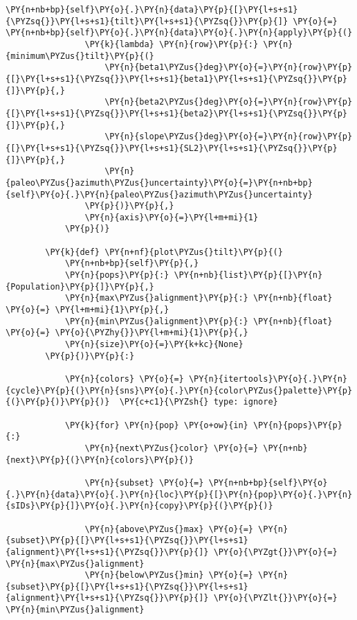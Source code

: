 \begin{tcolorbox}[breakable, size=fbox, boxrule=1pt, pad at break*=1mm,colback=cellbackground, colframe=cellborder]
\begin{Verbatim}[commandchars=\\\{\}]
            \PY{n+nb+bp}{self}\PY{o}{.}\PY{n}{data}\PY{p}{[}\PY{l+s+s1}{\PYZsq{}}\PY{l+s+s1}{tilt}\PY{l+s+s1}{\PYZsq{}}\PY{p}{]} \PY{o}{=} \PY{n+nb+bp}{self}\PY{o}{.}\PY{n}{data}\PY{o}{.}\PY{n}{apply}\PY{p}{(}
                \PY{k}{lambda} \PY{n}{row}\PY{p}{:} \PY{n}{minimum\PYZus{}tilt}\PY{p}{(}
                    \PY{n}{beta1\PYZus{}deg}\PY{o}{=}\PY{n}{row}\PY{p}{[}\PY{l+s+s1}{\PYZsq{}}\PY{l+s+s1}{beta1}\PY{l+s+s1}{\PYZsq{}}\PY{p}{]}\PY{p}{,}
                    \PY{n}{beta2\PYZus{}deg}\PY{o}{=}\PY{n}{row}\PY{p}{[}\PY{l+s+s1}{\PYZsq{}}\PY{l+s+s1}{beta2}\PY{l+s+s1}{\PYZsq{}}\PY{p}{]}\PY{p}{,}
                    \PY{n}{slope\PYZus{}deg}\PY{o}{=}\PY{n}{row}\PY{p}{[}\PY{l+s+s1}{\PYZsq{}}\PY{l+s+s1}{SL2}\PY{l+s+s1}{\PYZsq{}}\PY{p}{]}\PY{p}{,}
                    \PY{n}{paleo\PYZus{}azimuth\PYZus{}uncertainty}\PY{o}{=}\PY{n+nb+bp}{self}\PY{o}{.}\PY{n}{paleo\PYZus{}azimuth\PYZus{}uncertainty}
                \PY{p}{)}\PY{p}{,}
                \PY{n}{axis}\PY{o}{=}\PY{l+m+mi}{1}
            \PY{p}{)}
    
        \PY{k}{def} \PY{n+nf}{plot\PYZus{}tilt}\PY{p}{(}
            \PY{n+nb+bp}{self}\PY{p}{,}
            \PY{n}{pops}\PY{p}{:} \PY{n+nb}{list}\PY{p}{[}\PY{n}{Population}\PY{p}{]}\PY{p}{,}
            \PY{n}{max\PYZus{}alignment}\PY{p}{:} \PY{n+nb}{float} \PY{o}{=} \PY{l+m+mi}{1}\PY{p}{,}
            \PY{n}{min\PYZus{}alignment}\PY{p}{:} \PY{n+nb}{float} \PY{o}{=} \PY{o}{\PYZhy{}}\PY{l+m+mi}{1}\PY{p}{,}
            \PY{n}{size}\PY{o}{=}\PY{k+kc}{None}
        \PY{p}{)}\PY{p}{:}
    
            \PY{n}{colors} \PY{o}{=} \PY{n}{itertools}\PY{o}{.}\PY{n}{cycle}\PY{p}{(}\PY{n}{sns}\PY{o}{.}\PY{n}{color\PYZus{}palette}\PY{p}{(}\PY{p}{)}\PY{p}{)}  \PY{c+c1}{\PYZsh{} type: ignore}
    
            \PY{k}{for} \PY{n}{pop} \PY{o+ow}{in} \PY{n}{pops}\PY{p}{:}
                \PY{n}{next\PYZus{}color} \PY{o}{=} \PY{n+nb}{next}\PY{p}{(}\PY{n}{colors}\PY{p}{)}
    
                \PY{n}{subset} \PY{o}{=} \PY{n+nb+bp}{self}\PY{o}{.}\PY{n}{data}\PY{o}{.}\PY{n}{loc}\PY{p}{[}\PY{n}{pop}\PY{o}{.}\PY{n}{sIDs}\PY{p}{]}\PY{o}{.}\PY{n}{copy}\PY{p}{(}\PY{p}{)}
    
                \PY{n}{above\PYZus{}max} \PY{o}{=} \PY{n}{subset}\PY{p}{[}\PY{l+s+s1}{\PYZsq{}}\PY{l+s+s1}{alignment}\PY{l+s+s1}{\PYZsq{}}\PY{p}{]} \PY{o}{\PYZgt{}}\PY{o}{=} \PY{n}{max\PYZus{}alignment}
                \PY{n}{below\PYZus{}min} \PY{o}{=} \PY{n}{subset}\PY{p}{[}\PY{l+s+s1}{\PYZsq{}}\PY{l+s+s1}{alignment}\PY{l+s+s1}{\PYZsq{}}\PY{p}{]} \PY{o}{\PYZlt{}}\PY{o}{=} \PY{n}{min\PYZus{}alignment}
    

\end{Verbatim}
\end{tcolorbox}
